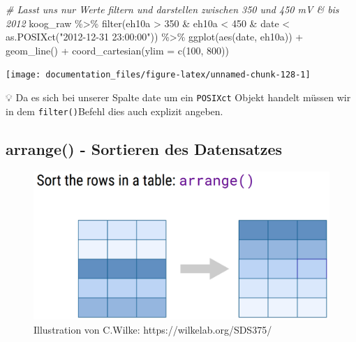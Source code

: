 \documentclass[
]{article}
\newenvironment{Shaded}{\begin{snugshade}}{\end{snugshade}}
\newcommand{\AttributeTok}[1]{\textcolor[rgb]{0.77,0.63,0.00}{#1}}
\newcommand{\CommentTok}[1]{\textcolor[rgb]{0.56,0.35,0.01}{\textit{#1}}}
\newcommand{\DecValTok}[1]{\textcolor[rgb]{0.00,0.00,0.81}{#1}}
\newcommand{\FunctionTok}[1]{\textcolor[rgb]{0.00,0.00,0.00}{#1}}
\newcommand{\NormalTok}[1]{#1}
\newcommand{\SpecialCharTok}[1]{\textcolor[rgb]{0.00,0.00,0.00}{#1}}
\newcommand{\StringTok}[1]{\textcolor[rgb]{0.31,0.60,0.02}{#1}}
\begin{document}
\begin{Shaded}
\begin{Highlighting}[]
\CommentTok{\# Lasst uns nur Werte filtern und darstellen zwischen 350 und 450 mV \& bis 2012}
\NormalTok{koog\_raw }\SpecialCharTok{\%\textgreater{}\%}
  \FunctionTok{filter}\NormalTok{(eh10a }\SpecialCharTok{\textgreater{}} \DecValTok{350} \SpecialCharTok{\&}\NormalTok{ eh10a }\SpecialCharTok{\textless{}} \DecValTok{450} \SpecialCharTok{\&}\NormalTok{ date }\SpecialCharTok{\textless{}} \FunctionTok{as.POSIXct}\NormalTok{(}\StringTok{"2012{-}12{-}31 23:00:00"}\NormalTok{)) }\SpecialCharTok{\%\textgreater{}\%}
  \FunctionTok{ggplot}\NormalTok{(}\FunctionTok{aes}\NormalTok{(date, eh10a)) }\SpecialCharTok{+}
  \FunctionTok{geom\_line}\NormalTok{() }\SpecialCharTok{+}
  \FunctionTok{coord\_cartesian}\NormalTok{(}\AttributeTok{ylim =} \FunctionTok{c}\NormalTok{(}\DecValTok{100}\NormalTok{, }\DecValTok{800}\NormalTok{))}
\end{Highlighting}
\end{Shaded}

\begin{center}\texttt{[image: documentation\_files/figure-latex/unnamed-chunk-128-1]} \end{center}

💡 Da es sich bei unserer Spalte date um ein \texttt{POSIXct} Objekt handelt müssen wir in dem \texttt{filter()}Befehl dies auch explizit angeben.

\hypertarget{arrange---sortieren-des-datensatzes}{%
\subsection{arrange() - Sortieren des Datensatzes}\label{arrange---sortieren-des-datensatzes}}

\begin{figure}

{\centering \includegraphics[width=16.81in]{images/038} 

}

\caption{Illustration von C.Wilke: https://wilkelab.org/SDS375/}\label{fig:unnamed-chunk-129}
\end{figure}
\end{document}
